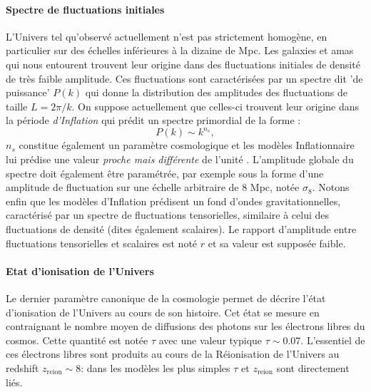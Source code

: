 \paragraph{Spectre de fluctuations initiales} L'Univers tel qu'observé actuellement n'est pas strictement homogène, en particulier sur des échelles inférieures à la dizaine de Mpc. Les galaxies et amas qui nous entourent trouvent leur origine dans des fluctuations initiales de densité de très faible amplitude. Ces fluctuations sont caractérisées par un spectre dit 'de puissance'  $P(k)$ qui donne la distribution des amplitudes des fluctuations de taille $L=2\pi/k$. On suppose actuellement que celles-ci trouvent leur origine dans la période \textit{d'Inflation} qui prédit un spectre primordial de la forme  :
\begin{equation}
P(k)\sim  k^{n_s},
\end{equation} 
$n_s$ constitue également un paramètre cosmologique et les modèles Inflationnaire lui prédise une valeur \textit{proche mais différente} de l'unité . L'amplitude globale du spectre doit également être paramétrée, par exemple sous la forme d'une amplitude de fluctuation sur une échelle arbitraire de 8 Mpc, notée $\sigma_8$. Notons enfin que les modèles d'Inflation prédisent un fond d'ondes gravitationnelles, caractérisé par un spectre de fluctuations tensorielles, similaire à celui des fluctuations de densité (dites également scalaires). Le rapport d'amplitude entre fluctuations tensorielles et scalaires est noté $r$ et sa valeur est supposée faible.

\paragraph{Etat d'ionisation de l'Univers} Le dernier paramètre canonique de la cosmologie permet de décrire l'état d'ionisation  de l'Univers au cours de son histoire. Cet état se mesure en  contraignant le nombre moyen de diffusions des photons sur les électrons libres du cosmos. Cette quantité est notée $\tau$ avec une valeur typique $\tau \sim 0.07$. L'essentiel de ces électrons libres sont produits au cours de la Réionisation  de l'Univers au redshift $z_\mathrm{reion}\sim 8$: dans les modèles les plus simples $\tau$ et $z_\mathrm{reion}$ sont directement liés.

